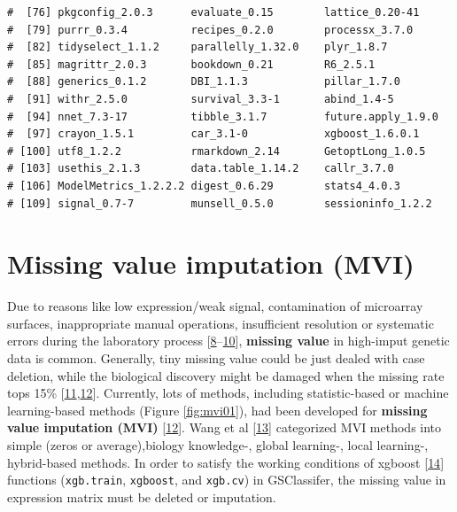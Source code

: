 \documentclass[
  12pt,
]{book}
\newcommand{\passthrough}[1]{#1}
\begin{document}
\begin{lstlisting}
#  [76] pkgconfig_2.0.3      evaluate_0.15        lattice_0.20-41     
#  [79] purrr_0.3.4          recipes_0.2.0        processx_3.7.0      
#  [82] tidyselect_1.1.2     parallelly_1.32.0    plyr_1.8.7          
#  [85] magrittr_2.0.3       bookdown_0.21        R6_2.5.1            
#  [88] generics_0.1.2       DBI_1.1.3            pillar_1.7.0        
#  [91] withr_2.5.0          survival_3.3-1       abind_1.4-5         
#  [94] nnet_7.3-17          tibble_3.1.7         future.apply_1.9.0  
#  [97] crayon_1.5.1         car_3.1-0            xgboost_1.6.0.1     
# [100] utf8_1.2.2           rmarkdown_2.14       GetoptLong_1.0.5    
# [103] usethis_2.1.3        data.table_1.14.2    callr_3.7.0         
# [106] ModelMetrics_1.2.2.2 digest_0.6.29        stats4_4.0.3        
# [109] signal_0.7-7         munsell_0.5.0        sessioninfo_1.2.2
\end{lstlisting}

\hypertarget{missing-value-imputation-mvi}{%
\section{Missing value imputation (MVI)}\label{missing-value-imputation-mvi}}

Due to reasons like low expression/weak signal, contamination of microarray surfaces, inappropriate manual operations, insufficient resolution or systematic errors during the laboratory process {[}\protect\hyperlink{ref-RN387}{8}--\protect\hyperlink{ref-RN382}{10}{]}, \textbf{missing value} in high-imput genetic data is common. Generally, tiny missing value could be just dealed with case deletion, while the biological discovery might be damaged when the missing rate tops 15\% {[}\protect\hyperlink{ref-RN392}{11},\protect\hyperlink{ref-RN386}{12}{]}. Currently, lots of methods, including statistic-based or machine learning-based methods (Figure \ref{fig:mvi01}), had been developed for \textbf{missing value imputation (MVI)} {[}\protect\hyperlink{ref-RN386}{12}{]}. Wang et al {[}\protect\hyperlink{ref-RN384}{13}{]} categorized MVI methods into simple (zeros or average),biology knowledge-, global learning-, local learning-, hybrid-based methods. In order to satisfy the working conditions of xgboost {[}\protect\hyperlink{ref-xgboost}{14}{]} functions (\passthrough{\lstinline!xgb.train!}, \passthrough{\lstinline!xgboost!}, and \passthrough{\lstinline!xgb.cv!}) in GSClassifer, the missing value in expression matrix must be deleted or imputation.
\end{document}
